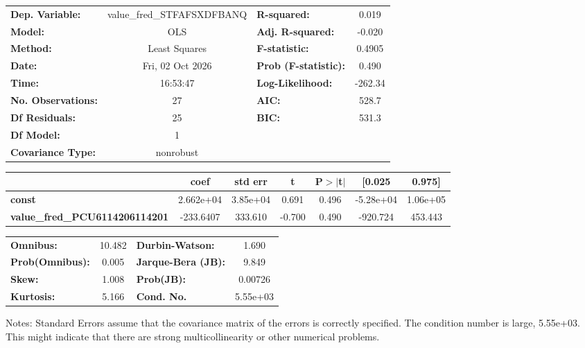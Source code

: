 \begin{center}
\begin{tabular}{lclc}
\toprule
\textbf{Dep. Variable:}                & value\_fred\_STFAFSXDFBANQ & \textbf{  R-squared:         } &     0.019   \\
\textbf{Model:}                        &            OLS             & \textbf{  Adj. R-squared:    } &    -0.020   \\
\textbf{Method:}                       &       Least Squares        & \textbf{  F-statistic:       } &    0.4905   \\
\textbf{Date:}                         &      Fri, 02 Oct 2026      & \textbf{  Prob (F-statistic):} &    0.490    \\
\textbf{Time:}                         &          16:53:47          & \textbf{  Log-Likelihood:    } &   -262.34   \\
\textbf{No. Observations:}             &               27           & \textbf{  AIC:               } &     528.7   \\
\textbf{Df Residuals:}                 &               25           & \textbf{  BIC:               } &     531.3   \\
\textbf{Df Model:}                     &                1           & \textbf{                     } &             \\
\textbf{Covariance Type:}              &         nonrobust          & \textbf{                     } &             \\
\bottomrule
\end{tabular}
\begin{tabular}{lcccccc}
                                       & \textbf{coef} & \textbf{std err} & \textbf{t} & \textbf{P$> |$t$|$} & \textbf{[0.025} & \textbf{0.975]}  \\
\midrule
\textbf{const}                         &    2.662e+04  &     3.85e+04     &     0.691  &         0.496        &    -5.28e+04    &     1.06e+05     \\
\textbf{value\_fred\_PCU6114206114201} &    -233.6407  &      333.610     &    -0.700  &         0.490        &     -920.724    &      453.443     \\
\bottomrule
\end{tabular}
\begin{tabular}{lclc}
\textbf{Omnibus:}       & 10.482 & \textbf{  Durbin-Watson:     } &    1.690  \\
\textbf{Prob(Omnibus):} &  0.005 & \textbf{  Jarque-Bera (JB):  } &    9.849  \\
\textbf{Skew:}          &  1.008 & \textbf{  Prob(JB):          } &  0.00726  \\
\textbf{Kurtosis:}      &  5.166 & \textbf{  Cond. No.          } & 5.55e+03  \\
\bottomrule
\end{tabular}
\end{center}

Notes: \newline
 [1] Standard Errors assume that the covariance matrix of the errors is correctly specified. \newline
 [2] The condition number is large, 5.55e+03. This might indicate that there are \newline
 strong multicollinearity or other numerical problems.
